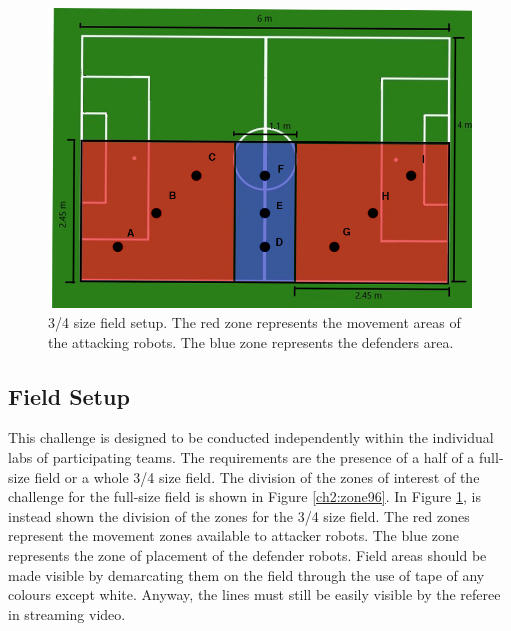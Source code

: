 \begin{figure}[ht]
\includegraphics[width=0.95\linewidth]{figs/ch_2_reduced.jpg}
\caption{3/4 size field setup. The red zone represents the movement areas of the attacking robots. The blue zone represents the defenders area.}
\label{ch2:zone64}
\centering
\end{figure}


\subsection{Field Setup}
This challenge is designed to be conducted independently within the individual labs of participating teams. The requirements are the presence of a half of a full-size field or a whole 3/4 size field. 
The division of the zones of interest of the challenge for the full-size field is shown in Figure \ref{ch2:zone96}. In Figure \ref{ch2:zone64}, is instead shown the division of the zones for the 3/4 size field.
The red zones represent the movement zones available to attacker robots. The blue zone represents the zone of placement of the defender robots.
Field areas should be made visible by demarcating them on the field through the use of tape of any colours except white. Anyway, the lines must still be easily visible by the referee in streaming video.




